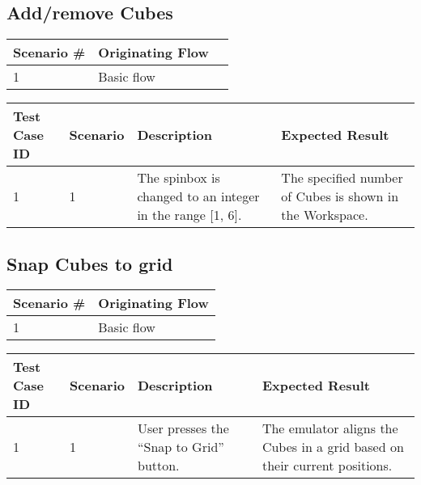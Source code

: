 \documentclass[12pt]{article}
\begin{document}
\clearpage

\subsection{Add/remove Cubes}

\begin{table}[h!]
  \begin{tabular}{l | l | l}
    \textbf{Scenario \#} &
    \textbf{Originating Flow} \\ \hline

    1 &
    Basic flow &
    \\ \hline

  \end{tabular}
\end{table}

\begin{table}[h!]
  \begin{tabular}{p{.5in} | p{.75in} | p{2.15in} | p{2.15in}}
    \textbf{Test Case ID} &
    \textbf{Scenario} &
    \textbf{Description} &
    \textbf{Expected Result} \\ \hline

    1 &
    1 &
    The spinbox is changed to an integer in the range [1, 6]. &
    The specified number of Cubes is shown in the Workspace. \\ \hline

  \end{tabular}
\end{table}

\subsection{Snap Cubes to grid}

\begin{table}[h!]
  \begin{tabular}{l | l}
    \textbf{Scenario \#} &
    \textbf{Originating Flow} \\ \hline

    1 &
    Basic flow \\ \hline

  \end{tabular}
\end{table}

\begin{table}[h!]
  \begin{tabular}{p{.5in} | p{.75in} | p{2.15in} | p{2.15in}}
    \textbf{Test Case ID} &
    \textbf{Scenario} &
    \textbf{Description} &
    \textbf{Expected Result} \\ \hline

    1 &
    1 &
    User presses the ``Snap to Grid'' button. &
    The emulator aligns the Cubes in a grid based on their current positions.  \\ \hline

  \end{tabular}
\end{table}
\end{document}
